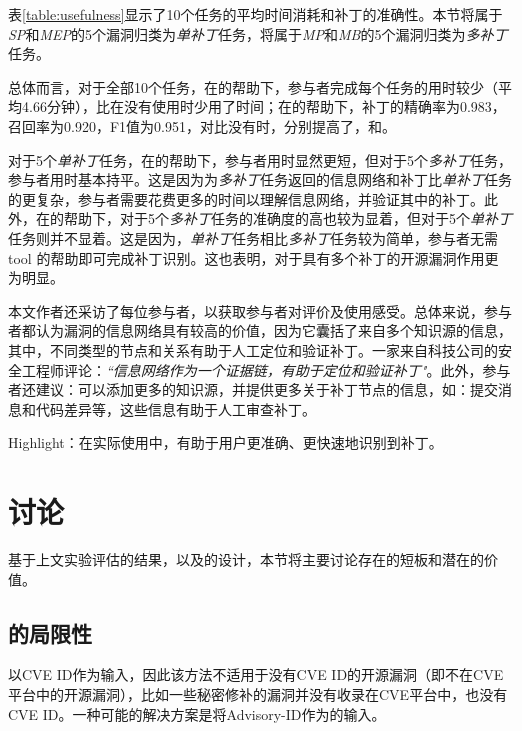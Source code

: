 表\ref{table:usefulness}显示了10个任务的平均时间消耗和补丁的准确性。本节将属于\textit{SP}和\textit{MEP}的5个漏洞归类为\textit{单补丁}任务，将属于\textit{MP}和\textit{MB}的5个漏洞归类为\textit{多补丁}任务。

总体而言，对于全部10个任务，在\tool 的帮助下，参与者完成每个任务的用时较少（平均4.66分钟），比在没有使用\tool 时少用了时间；在\tool 的帮助下，补丁的精确率为0.983，召回率为0.920，F1值为0.951，对比没有\tool 时，分别提高了，和。

对于5个\textit{单补丁}任务，在\tool 的帮助下，参与者用时显然更短，但对于5个\textit{多补丁}任务，参与者用时基本持平。这是因为\tool 为\textit{多补丁}任务返回的信息网络和补丁比\textit{单补丁}任务的更复杂，参与者需要花费更多的时间以理解信息网络，并验证其中的补丁。此外，在\tool 的帮助下，对于5个\textit{多补丁}任务的准确度的高也较为显着，但对于5个\textit{单补丁}任务则并不显着。这是因为，\textit{单补丁}任务相比\textit{多补丁}任务较为简单，参与者无需tool 的帮助即可完成补丁识别。这也表明，\tool 对于具有多个补丁的开源漏洞作用更为明显。

本文作者还采访了每位参与者，以获取参与者对\tool 评价及使用感受。总体来说，参与者都认为漏洞的信息网络具有较高的价值，因为它囊括了来自多个知识源的信息，其中，不同类型的节点和关系有助于人工定位和验证补丁。一家来自科技公司的安全工程师评论：\textit{``信息网络作为一个证据链，有助于定位和验证补丁"}。此外，参与者还建议：\tool 可以添加更多的知识源，并提供更多关于补丁节点的信息，如：提交消息和代码差异等，这些信息有助于人工审查补丁。

\begin{tcolorbox}[size=title,opacityfill=0.15]
Highlight：在实际使用中，\tool 有助于用户更准确、更快速地识别到补丁。
\end{tcolorbox}

\section{讨论}

基于上文实验评估的结果，以及\tool 的设计，本节将主要讨论\tool 存在的短板和潜在的价值。
\subsection{\tool 的局限性}
\tool 以CVE ID作为输入，因此该方法不适用于没有CVE ID的开源漏洞（即不在CVE平台中的开源漏洞），比如一些秘密修补的漏洞并没有收录在CVE平台中，也没有CVE ID。一种可能的解决方案是将Advisory-ID作为\tool 的输入。

